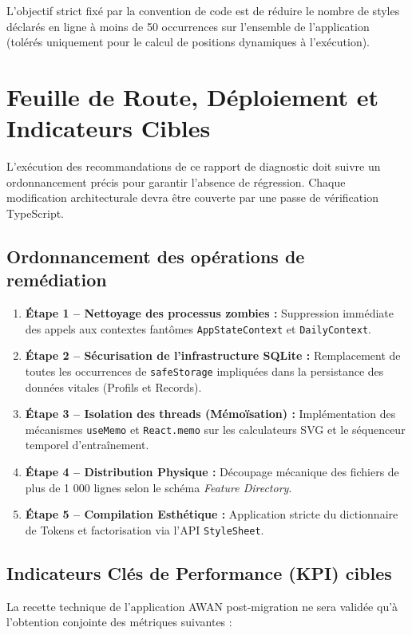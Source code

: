 \documentclass[11pt, a4paper]{article}
\begin{document}
L'objectif strict fixé par la convention de code est de réduire le nombre de styles déclarés en ligne à moins de 50 occurrences sur l'ensemble de l'application (tolérés uniquement pour le calcul de positions dynamiques à l'exécution).

\newpage

\section{Feuille de Route, Déploiement et Indicateurs Cibles}

L'exécution des recommandations de ce rapport de diagnostic doit suivre un ordonnancement précis pour garantir l'absence de régression. Chaque modification architecturale devra être couverte par une passe de vérification TypeScript.

\subsection{Ordonnancement des opérations de remédiation}

\begin{enumerate}
    \item \textbf{Étape 1 -- Nettoyage des processus zombies :} Suppression immédiate des appels aux contextes fantômes \texttt{AppStateContext} et \texttt{DailyContext}.
    \item \textbf{Étape 2 -- Sécurisation de l'infrastructure SQLite :} Remplacement de toutes les occurrences de \texttt{safeStorage} impliquées dans la persistance des données vitales (Profils et Records).
    \item \textbf{Étape 3 -- Isolation des threads (Mémoïsation) :} Implémentation des mécanismes \texttt{useMemo} et \texttt{React.memo} sur les calculateurs SVG et le séquenceur temporel d'entraînement.
    \item \textbf{Étape 4 -- Distribution Physique :} Découpage mécanique des fichiers de plus de 1 000 lignes selon le schéma \textit{Feature Directory}.
    \item \textbf{Étape 5 -- Compilation Esthétique :} Application stricte du dictionnaire de Tokens et factorisation via l'API \texttt{StyleSheet}.
\end{enumerate}

\subsection{Indicateurs Clés de Performance (KPI) cibles}
La recette technique de l'application AWAN post-migration ne sera validée qu'à l'obtention conjointe des métriques suivantes :
\end{document}
